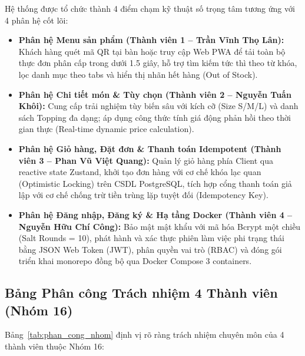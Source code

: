 \documentclass[a4paper]{article}
\begin{document}
Hệ thống được tổ chức thành 4 điểm chạm kỹ thuật số trọng tâm tương ứng với 4 phân hệ cốt lõi:
\begin{itemize}
    \item \textbf{Phân hệ Menu sản phẩm (Thành viên 1 -- Trần Vĩnh Thọ Lân):} Khách hàng quét mã QR tại bàn hoặc truy cập Web PWA để tải toàn bộ thực đơn phân cấp trong dưới 1.5 giây, hỗ trợ tìm kiếm tức thì theo từ khóa, lọc danh mục theo tabs và hiển thị nhãn hết hàng (Out of Stock).
    \item \textbf{Phân hệ Chi tiết món \& Tùy chọn (Thành viên 2 -- Nguyễn Tuấn Khôi):} Cung cấp trải nghiệm tùy biến sâu với kích cỡ (Size S/M/L) và danh sách Topping đa dạng; áp dụng công thức tính giá động phản hồi theo thời gian thực (Real-time dynamic price calculation).
    \item \textbf{Phân hệ Giỏ hàng, Đặt đơn \& Thanh toán Idempotent (Thành viên 3 -- Phan Vũ Việt Quang):} Quản lý giỏ hàng phía Client qua reactive state Zustand, khởi tạo đơn hàng với cơ chế khóa lạc quan (Optimistic Locking) trên CSDL PostgreSQL, tích hợp cổng thanh toán giả lập với cơ chế chống trừ tiền trùng lặp tuyệt đối (Idempotency Key).
    \item \textbf{Phân hệ Đăng nhập, Đăng ký \& Hạ tầng Docker (Thành viên 4 -- Nguyễn Hữu Chí Công):} Bảo mật mật khẩu với mã hóa Bcrypt một chiều (Salt Rounds = 10), phát hành và xác thực phiên làm việc phi trạng thái bằng JSON Web Token (JWT), phân quyền vai trò (RBAC) và đóng gói triển khai monorepo đồng bộ qua Docker Compose 3 containers.
\end{itemize}

\subsection{Bảng Phân công Trách nhiệm 4 Thành viên (Nhóm 16)}
Bảng~\ref{tab:phan_cong_nhom} định vị rõ ràng trách nhiệm chuyên môn của 4 thành viên thuộc Nhóm 16:
\end{document}
